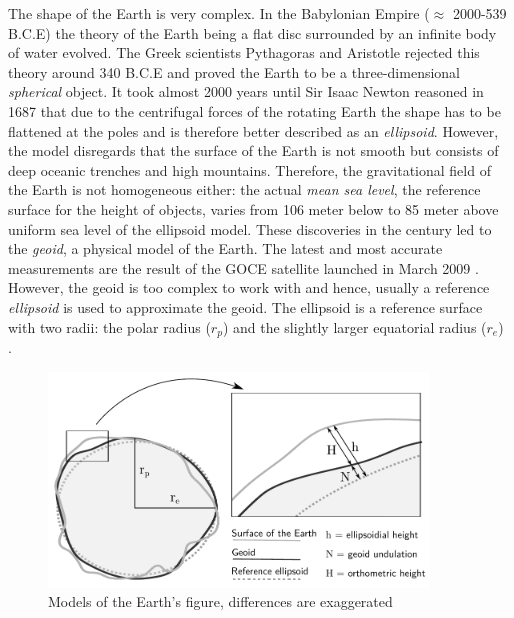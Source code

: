 The shape of the Earth is very complex.
In the Babylonian Empire ($\approx$ 2000-539 B.C.E) the theory of the Earth being a flat disc surrounded by an infinite body of water evolved.
The Greek scientists Pythagoras and Aristotle rejected this theory around 340 B.C.E and proved the Earth to be a three-dimensional \emph{spherical} object.
It took almost 2000 years until Sir Isaac Newton reasoned in 1687 that due to the centrifugal forces of the rotating Earth the shape has to be flattened at the poles and is therefore better described as an \emph{ellipsoid}.
However, the model disregards that the surface of the Earth is not smooth but consists of deep oceanic trenches and high mountains. Therefore, the gravitational field of the Earth is not homogeneous either: the actual \emph{mean sea level}, the reference surface for the height of objects, varies from 106 meter below to 85 meter above uniform sea level of the ellipsoid model. These discoveries in the  century led to the \emph{geoid}, a physical model of the Earth. The latest and most accurate measurements are the result of the GOCE satellite launched in March 2009 \cite{geoid, geoidESRI}.
However, the geoid is too complex to work with and hence, usually a reference \emph{ellipsoid} is used to approximate the geoid. The ellipsoid is a reference surface with two radii: the polar radius ($r_p$) and the slightly larger equatorial radius ($r_e$) \cite[pp. 69-77]{bolstad2008gis}.

\begin{figure}[H]
  \centering
  \includegraphics[width=0.9\textwidth]{graphics/basics/hgis/earth_models}
  \caption{Models of the Earth's figure, differences are exaggerated \cite[Fig. 3-6, p. 75]{bolstad2008gis}}
  \label{fig:geoid}
\end{figure}

